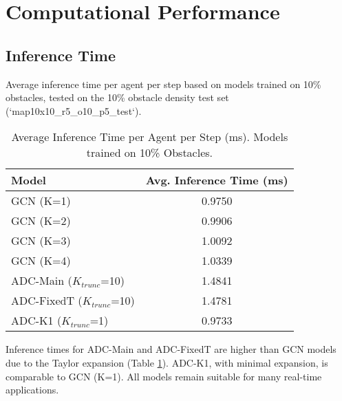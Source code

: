 \section{Computational Performance}
\label{sec:comp_perf_detailed}

\subsection{Inference Time}
\label{subsec:inference_time_detailed}
Average inference time per agent per step based on models trained on 10\% obstacles, tested on the 10\% obstacle density test set (`map10x10_r5_o10_p5_test`).

\begin{table}[htbp]
    \centering
    \caption{Average Inference Time per Agent per Step (ms). Models trained on 10\% Obstacles.}
    \label{tab:inference_time_detailed}
    \begin{tabular}{lc}
        \toprule
        Model & Avg. Inference Time (ms) \\
        \midrule
        GCN (K=1) & 0.9750 \\
        GCN (K=2) & 0.9906 \\
        GCN (K=3) & 1.0092 \\
        GCN (K=4) & 1.0339 \\
        \midrule
        ADC-Main ($K_{trunc}$=10) & 1.4841 \\
        ADC-FixedT ($K_{trunc}$=10) & 1.4781 \\
        ADC-K1 ($K_{trunc}$=1) & 0.9733 \\
        \bottomrule
    \end{tabular}
\end{table}
Inference times for ADC-Main and ADC-FixedT are higher than GCN models due to the Taylor expansion (Table \ref{tab:inference_time_detailed}). ADC-K1, with minimal expansion, is comparable to GCN (K=1). All models remain suitable for many real-time applications.

